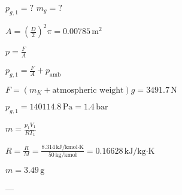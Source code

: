 \( p_{g,1} = ? \)  
\( m_g = ? \)  

\( A = \left(\frac{D}{2}\right)^2 \pi = 0.00785 \, \text{m}^2 \)  

\( p = \frac{F}{A} \)  

\( p_{g,1} = \frac{F}{A} + p_{\text{amb}} \)  

\( F = (m_K + \text{atmospheric weight}) g = 3491.7 \, \text{N} \)  

\( p_{g,1} = 140114.8 \, \text{Pa} = 1.4 \, \text{bar} \)  

\( m = \frac{p_{1} V_{1}}{R T_{1}} \)  

\( R = \frac{\overline{R}}{M} = \frac{8.314 \, \text{kJ/kmol·K}}{50 \, \text{kg/kmol}} = 0.16628 \, \text{kJ/kg·K} \)  

\( m = 3.49 \, \text{g} \)  

---